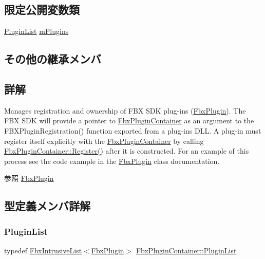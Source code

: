 \subsection*{限定公開変数類}
\begin{DoxyCompactItemize}
\item 
\hyperlink{class_fbx_plugin_container_a42abd8471efa91f56de2c4c64c220972}{Plugin\+List} \hyperlink{class_fbx_plugin_container_a89a3739ecdf85a1eaeb72ad8bd8a0587}{m\+Plugins}
\end{DoxyCompactItemize}
\subsection*{その他の継承メンバ}


\subsection{詳解}
Manages registration and ownership of F\+BX S\+DK plug-\/ins (\hyperlink{class_fbx_plugin}{Fbx\+Plugin}). The F\+BX S\+DK will provide a pointer to \hyperlink{class_fbx_plugin_container}{Fbx\+Plugin\+Container} as an argument to the F\+B\+X\+Plugin\+Registration() function exported from a plug-\/in\textquotesingle{}s D\+LL. A plug-\/in must register itself explicitly with the \hyperlink{class_fbx_plugin_container}{Fbx\+Plugin\+Container} by calling \hyperlink{class_fbx_plugin_container_a3fc28ffe0296973afb3014112b4b0df0}{Fbx\+Plugin\+Container\+::\+Register()} after it is constructed. For an example of this process see the code example in the \hyperlink{class_fbx_plugin}{Fbx\+Plugin} class documentation. \begin{DoxySeeAlso}{参照}
\hyperlink{class_fbx_plugin}{Fbx\+Plugin} 
\end{DoxySeeAlso}


\subsection{型定義メンバ詳解}
\mbox{\label{class_fbx_plugin_container_a42abd8471efa91f56de2c4c64c220972}} 
\subsubsection{\texorpdfstring{Plugin\+List}{PluginList}}
{\footnotesize\ttfamily typedef \hyperlink{class_fbx_intrusive_list}{Fbx\+Intrusive\+List}$<$\hyperlink{class_fbx_plugin}{Fbx\+Plugin}$>$ \hyperlink{class_fbx_plugin_container_a42abd8471efa91f56de2c4c64c220972}{Fbx\+Plugin\+Container\+::\+Plugin\+List}}



